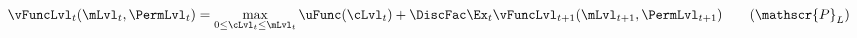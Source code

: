   \begin{align}\label{eq:levelRecProblem}
    \vFuncLvl_{t}(\mLvl_{t}, \PermLvl_{t}) & = \max_{0 \leq\cLvl_{t} \leq \mLvl_{t}} \uFunc(\cLvl_{t}) + \DiscFac \Ex_{t}\vFuncLvl_{t+1}(\mLvl_{t+1}, \PermLvl_{t+1}) \tag{$\mathscr{P}_{L}$}
  \end{align}
